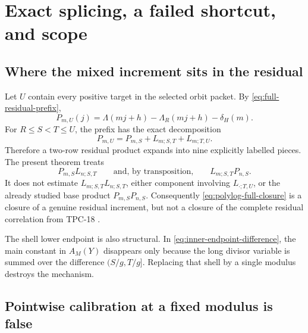 \section{Exact splicing, a failed shortcut, and scope}
\label{sec:splicing-scope}

\subsection{Where the mixed increment sits in the residual}

Let \(U\) contain every positive target in the selected orbit packet.
By \eqref{eq:full-residual-prefix},
\begin{equation}
 P_{m,U}(j)=
 \Lambda(mj+h)-\Lambda_R(mj+h)-\delta_H(m).
 \label{eq:full-calibrated-residual}
\end{equation}
For \(R\le S<T\le U\), the prefix has the exact decomposition
\begin{equation}
 P_{m,U}=P_{m,S}+L_{m;S,T}+L_{m;T,U}.
 \label{eq:three-piece-prefix}
\end{equation}
Therefore a two-row residual product expands into nine explicitly
labelled pieces.  The present theorem treats
\begin{equation}
 P_{m,S}L_{n;S,T}
 \qquad\text{and, by transposition,}\qquad
 L_{m;S,T}P_{n,S}.
 \label{eq:treated-two-pieces}
\end{equation}
It does not estimate \(L_{m;S,T}L_{n;S,T}\), either component
involving \(L_{\cdot;T,U}\), or the already studied base product
\(P_{m,S}P_{n,S}\).  Consequently
\eqref{eq:polylog-full-closure} is a closure of a genuine residual
increment, but not a closure of the complete residual correlation from
TPC-18 \citep{WangTPC18}.

The shell lower endpoint is also structural.  In
\eqref{eq:inner-endpoint-difference}, the main constant in
\(A_M(Y)\) disappears only because the long divisor variable is summed
over the difference \((S/g,T/g]\).  Replacing that shell by a single
modulus destroys the mechanism.

\subsection{Pointwise calibration at a fixed modulus is false}

